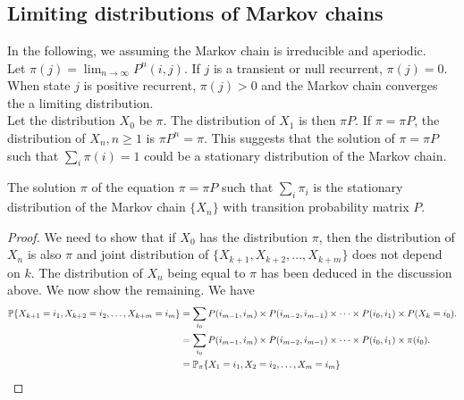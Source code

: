 \documentclass[all-lectures.tex]{subfiles}
\begin{document}

\setcounter{section}{2}
\setcounter{subsection}{0}

\section*{}
\subsection{Limiting distributions of Markov chains}
In the following, we assuming the Markov chain is irreducible and aperiodic. \\
\indent Let $\pi(j) = \lim_{n\rightarrow \infty} P^n(i,j)$. If $j$ is a transient or null recurrent, $\pi(j) = 0$. When state $j$ is positive recurrent, $\pi(j) > 0$ and the Markov chain converges the a limiting distribution. \\
\indent Let the distribution $X_0$ be $\pi$. The distribution of $X_1$ is then $\pi P$. If $\pi = \pi P$, the distribution of $X_n, n \geq 1$ is $\pi P^n = \pi$. This suggests that the solution of $\pi = \pi P$ such that $\sum_i \pi(i) = 1$ could be a stationary distribution of the Markov chain.
\begin{prop}
The solution $\pi$ of the equation $\pi = \pi P$ such that $\sum_i \pi_i$ is the stationary distribution of the Markov chain $\{X_n\}$ with transition probability matrix $P$.
\begin{proof}
We need to show that if $X_0$ has the distribution $\pi$, then the distribution of $X_n$ is also $\pi$ and joint distribution of $\{X_{k+1},X_{k+2},\dots,X_{k+m}\}$ does not depend on $k$. The distribution of $X_n$ being equal to $\pi$ has been deduced in the discussion above. We now show the remaining. {\color{red}We have 
\begin{align*}
\P\{X_{k+1} = i_1,X_{k+2} = i_2,\dots,X_{k+m} = i_m\} &= \sum_{i_0} P(i_{m-1},i_{m}) \times P(i_{m-2},i_{m-1}) \times \dots \times P(i_{0},i_{1}) \times P(X_{k} = i_0). \\
&= \sum_{i_0} P(i_{m-1},i_{m}) \times P(i_{m-2},i_{m-1}) \times \dots \times P(i_{0},i_{1}) \times \pi(i_0). \\
&= \P_{\pi}\{X_{1} = i_1,X_{2} = i_2,\dots,X_{m} = i_m\} 
\end{align*}
}
\end{proof}
\end{prop}
\end{document}
